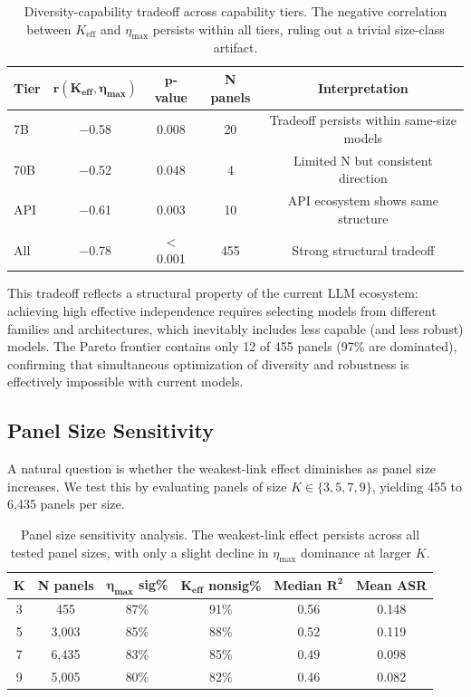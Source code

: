 \documentclass[11pt]{article}
\begin{document}
\begin{table}[t]
\centering
\caption{Diversity-capability tradeoff across capability tiers. The negative correlation between $K_{\text{eff}}$ and $\eta_{\max}$ persists within all tiers, ruling out a trivial size-class artifact.}
\label{tab:tradeoff}
\small
\begin{tabular}{lcccc}
\toprule
\textbf{Tier} & $\boldsymbol{r(K_{\text{eff}}, \eta_{\max})}$ & $\boldsymbol{p}$\textbf{-value} & \textbf{N panels} & \textbf{Interpretation} \\
\midrule
7B  & $-$0.58 & 0.008    & 20  & Tradeoff persists within same-size models \\
70B & $-$0.52 & 0.048    & 4   & Limited N but consistent direction \\
API & $-$0.61 & 0.003    & 10  & API ecosystem shows same structure \\
All & $-$0.78 & $<$0.001 & 455 & Strong structural tradeoff \\
\bottomrule
\end{tabular}
\end{table}

This tradeoff reflects a structural property of the current LLM ecosystem: achieving high effective independence requires selecting models from different families and architectures, which inevitably includes less capable (and less robust) models. The Pareto frontier contains only 12 of 455 panels (97\% are dominated), confirming that simultaneous optimization of diversity and robustness is effectively impossible with current models.

\subsection{Panel Size Sensitivity}
\label{sec:panel-size}

A natural question is whether the weakest-link effect diminishes as panel size increases. We test this by evaluating panels of size $K \in \{3, 5, 7, 9\}$, yielding 455 to 6,435 panels per size.

\begin{table}[t]
\centering
\caption{Panel size sensitivity analysis. The weakest-link effect persists across all tested panel sizes, with only a slight decline in $\eta_{\max}$ dominance at larger $K$.}
\label{tab:panel-size}
\small
\begin{tabular}{cccccc}
\toprule
$\boldsymbol{K}$ & \textbf{N panels} & $\boldsymbol{\eta_{\max}}$ \textbf{sig\%} & $\boldsymbol{K_{\text{eff}}}$ \textbf{nonsig\%} & \textbf{Median} $\boldsymbol{R^2}$ & \textbf{Mean ASR} \\
\midrule
3 & 455   & 87\% & 91\% & 0.56 & 0.148 \\
5 & 3,003 & 85\% & 88\% & 0.52 & 0.119 \\
7 & 6,435 & 83\% & 85\% & 0.49 & 0.098 \\
9 & 5,005 & 80\% & 82\% & 0.46 & 0.082 \\
\bottomrule
\end{tabular}
\end{table}
\end{document}
